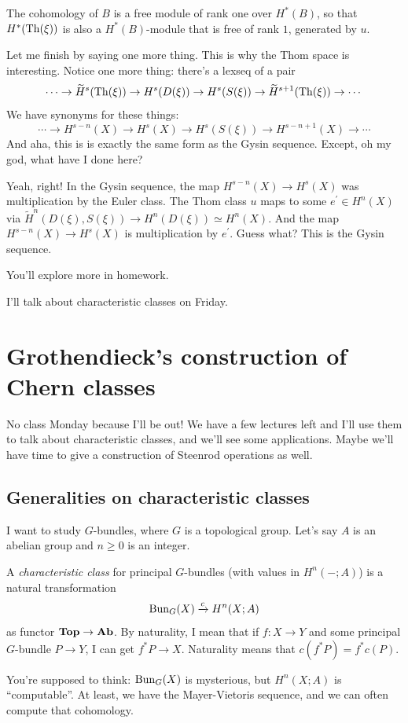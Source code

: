 The cohomology of $B$ is a free module of rank one over $H^\ast(B)$, so that $H^\ast(\operatorname{Th}(\xi))$ is also a $H^\ast(B)$-module that is free of rank $1$, generated by $u$.

Let me finish by saying one more thing.
This is why the Thom space is interesting.
Notice one more thing: there's a lexseq of a pair
$$
\cdots\to \widetilde{H}^s(\operatorname{Th}(\xi)) \to H^s(D(\xi)) \to H^s(S(\xi)) \to \widetilde{H}^{s+1}(\operatorname{Th}(\xi)) \to \cdots
$$
We have synonyms for these things:
$$
\cdots \to H^{s-n}(X) \to H^s(X) \to H^s(S(\xi)) \to H^{s-n+1}(X) \to \cdots
$$
And aha, this is is exactly the same form as the Gysin sequence.
Except, oh my god, what have I done here?

Yeah, right!
In the Gysin sequence, the map $H^{s-n}(X) \to H^s(X)$ was multiplication by the Euler class.
The Thom class $u$ maps to some $e^\prime\in H^n(X)$ via $\widetilde{H}^n(D(\xi),S(\xi)) \to H^n(D(\xi)) \simeq H^n(X)$.
And the map $H^{s-n}(X) \to H^s(X)$ is multiplication by $e^\prime$.
Guess what?
This is the Gysin sequence.

You'll explore more in homework.

I'll talk about characteristic classes on Friday.
\section{Grothendieck's construction of Chern classes}
No class Monday because I'll be out!
We have a few lectures left and I'll use them to talk about characteristic classes, and we'll see some applications.
Maybe we'll have time to give a construction of Steenrod operations as well.
\subsection{Generalities on characteristic classes}
I want to study $G$-bundles, where $G$ is a topological group.
Let's say $A$ is an abelian group and $n\geq 0$ is an integer.
\begin{definition}
    A \emph{characteristic class} for principal $G$-bundles (with values in $H^n(-;A)$) is a natural transformation
    $$
    \mathrm{Bun}_G(X) \xrightarrow{{c}} H^n(X;A)
    $$
    as functor $\mathbf{Top}\to \mathbf{Ab}$.
    By naturality, I mean that if $f:X\to Y$ and some principal $G$-bundle $P\to Y$, I can get $f^\ast P\to X$.
    Naturality means that $c(f^\ast P) = f^\ast c(P)$.
\end{definition}
You're supposed to think: $\mathrm{Bun}_G(X)$ is mysterious, but $H^n(X;A)$ is ``computable''.
At least, we have the Mayer-Vietoris sequence, and we can often compute that cohomology.

